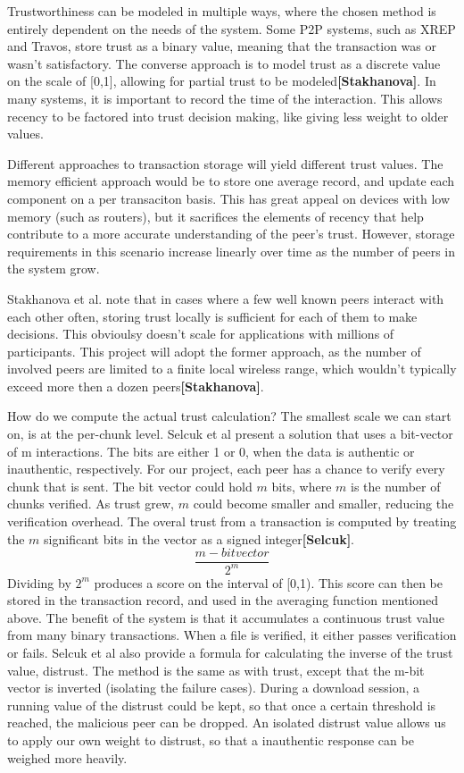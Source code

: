 \documentclass[12pt]{article}
\newcommand{\lcite}[1]
{{\bfseries\color{orange}[#1]}}
\begin{document}
			Trustworthiness can be modeled in multiple ways, where the chosen method is entirely dependent on the needs of the system. Some P2P systems, such as XREP and Travos, store trust as a binary value, meaning that the transaction was or wasn't satisfactory. The converse approach is to model trust as a discrete value on the scale of [0,1], allowing for partial trust to be modeled\lcite{Stakhanova}. In many systems, it is important to record the time of the interaction. This allows recency to be factored into trust decision making, like giving less weight to older values.

			Different approaches to transaction storage will yield different trust values. The memory efficient approach would be to store one average record, and update each component on a per transaciton basis. This has great appeal on devices with low memory (such as routers), but it sacrifices the elements of recency that help contribute to a more accurate understanding of the peer's trust. However, storage requirements in this scenario increase linearly over time as the number of peers in the system grow.

			Stakhanova et al. note that in cases where a few well known peers interact with each other often, storing trust locally is sufficient for each of them to make decisions. This obvioulsy doesn't scale for applications with millions of participants. This project will adopt the former approach, as the number of involved peers are limited to a finite local wireless range, which wouldn't typically exceed more then a dozen peers\lcite{Stakhanova}.

			How do we compute the actual trust calculation? The smallest scale we can start on, is at the per-chunk level. Selcuk et al present a solution that uses a bit-vector of m interactions. The bits are either 1 or 0, when the data is authentic or inauthentic, respectively. For our project, each peer has a chance to verify every chunk that is sent. The bit vector could hold $m$ bits, where $m$ is the number of chunks verified. As trust grew, $m$ could become smaller and smaller, reducing the verification overhead. The overal trust from a transaction is computed by treating the $m$ significant bits in the vector as a signed integer\lcite{Selcuk}.
				$$
						\frac{m-bit vector}{2^m}
				$$
			Dividing by $2^m$ produces a score on the interval of [0,1). This score can then be stored in the transaction record, and used in the averaging function mentioned above. The benefit of the system is that it accumulates a continuous trust value from many binary transactions. When a file is verified, it either passes verification or fails. Selcuk et al also provide a formula for calculating the inverse of the trust value, distrust. The method is the same as with trust, except that the m-bit vector is inverted (isolating the failure cases). During a download session, a running value of the distrust could be kept, so that once a certain threshold is reached, the malicious peer can be dropped. An isolated distrust value allows us to apply our own weight to distrust, so that a inauthentic response can be weighed more heavily. 
\end{document}
